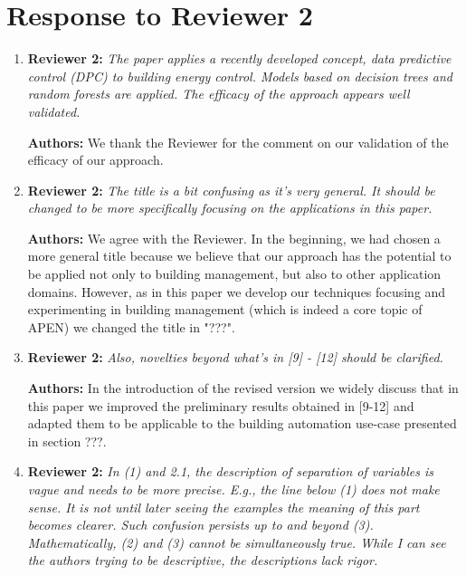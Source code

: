 \documentclass{article}
\begin{document}
\section{Response to Reviewer 2}



\begin{enumerate}



\item \textbf{Reviewer 2:} \textit{The paper applies a recently developed concept, data predictive control (DPC) to building energy control. Models based on decision trees and random forests are applied. The efficacy of the approach appears well validated.}



\textbf{Authors:} We thank the Reviewer for the comment on our validation of the efficacy of our approach.



\item \textbf{Reviewer 2:} \textit{The title is a bit confusing as it's very general. It should be changed to be more specifically focusing on the applications in this paper.}



\textbf{Authors:} We agree with the Reviewer. In the beginning, we had chosen a more general title because we believe that our approach has the potential to be applied not only to building management, but also to other application domains. However, as in this paper we develop our techniques focusing and experimenting in building management (which is indeed a core topic of APEN) we changed the title in "???". 



\item \textbf{Reviewer 2:} \textit{Also, novelties beyond what's in [9] - [12] should be clarified.}



\textbf{Authors:} In the introduction of the revised version we widely discuss that in this paper we improved the preliminary results obtained in [9-12] and adapted them to be applicable to the building automation use-case presented in section ???.



\item \textbf{Reviewer 2:} \textit{In (1) and 2.1, the description of separation of variables is vague and needs to be more precise. E.g., the line below (1) does not make sense. It is not until later seeing the examples the meaning of this part becomes clearer. Such confusion persists up to and beyond (3). Mathematically, (2) and (3) cannot be simultaneously true. While I can see the authors trying to be descriptive, the descriptions lack rigor.} 




\end{enumerate}
\end{document}
